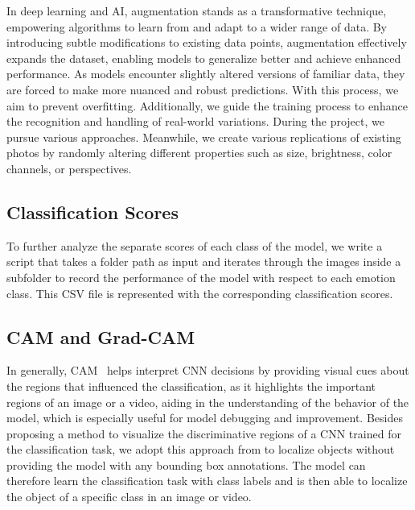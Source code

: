 In deep learning and AI, 
augmentation stands as a transformative technique, 
empowering algorithms to learn from and adapt to a wider range of data. 
By introducing subtle modifications to existing data points, 
augmentation effectively expands the dataset, 
enabling models to generalize better and achieve enhanced performance. 
As models encounter slightly altered versions of familiar data, 
they are forced to make more nuanced and robust predictions. 
With this process, we aim to prevent overfitting. %
Additionally, we guide the training process to enhance the recognition and handling of real-world variations.
During the project, we pursue various approaches. 
Meanwhile, we create various replications of existing photos by randomly altering different properties such as size, brightness, color channels, or perspectives.


\subsection{Classification Scores}
\label{sec:optim:csv}
To further analyze the separate scores of each class of the model, 
we write a script that takes a folder path as input and iterates through the images inside a subfolder to record the performance of the model with respect to each emotion class. 
This CSV file is represented with the corresponding classification scores. 

\subsection{CAM and Grad-CAM} %
\label{sec:optim:cam}

In generally, 
CAM~\cite{ZhouKLOT16} helps interpret CNN decisions by providing visual cues about the regions that influenced the classification, 
as it highlights the important regions of an image or a video, 
aiding in the understanding of the behavior of the model, 
which is especially useful for model debugging and improvement. 
Besides proposing a method to visualize the discriminative regions of a CNN trained for the classification task, %
we adopt this approach from \citet{ZhouKLOT16} to localize objects without providing the model with any bounding box annotations. 
The model can therefore learn the classification task with class labels and is then able to localize the object of a specific class in an image or video. 

